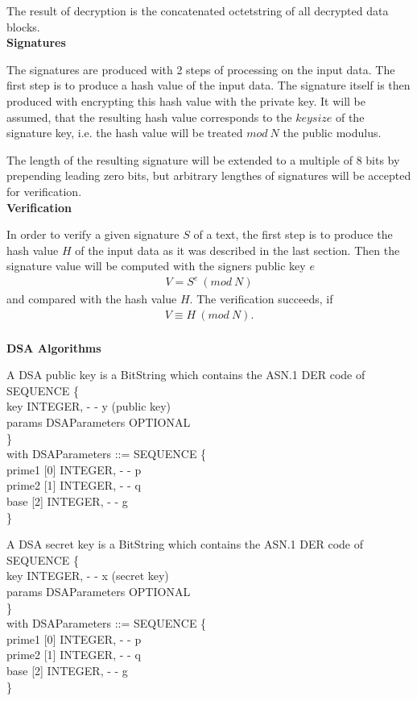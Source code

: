 The result of decryption is the concatenated octetstring of all decrypted
data blocks.
\\ [1em]
{\bf Signatures} 

The signatures are produced with 2 steps of processing on the input data.
The first step is to produce a hash value of the input data. The signature
itself is then produced with encrypting this hash value with the private
key. It will be assumed, that the resulting hash value corresponds to the
$keysize$ of the signature key, i.e. the hash value will be treated $mod 
~N$
the public modulus.

The length of the resulting signature will be extended to a multiple of
8 bits by prepending leading zero bits, but arbitrary lengthes of
signatures will be accepted for verification.
\\ [1em]
{\bf Verification}

In order to verify a given signature $S$ of a text, the first step is to
produce the hash value $H$ of the input data as it was described in the 
last section.
Then the signature value will be computed with the signers public key $e$ 
\begin{eqnarray*}
	V = S^e ~(mod ~N)
\end{eqnarray*}
\noindent
and compared with the hash value $H$. The verification succeeds, if
\begin{eqnarray*}
	V \equiv H ~(mod ~N).
\end{eqnarray*}
\\ [1em]
{\large\bf DSA Algorithms}

    A DSA public key is a BitString
    which contains the ASN.1 DER code of
    \bvtab
    \4  SEQUENCE \{ \\
    \4  \2       key INTEGER, - - y (public key)   \\
    \4  \2       params DSAParameters OPTIONAL  \\
    \4  \} \\
    \evtab
    with
    \bvtab
    DSAParameters ::= SEQUENCE \{ \\
    \4  \2       prime1 [0] INTEGER, - - p \\
    \4  \2       prime2 [1] INTEGER, - - q \\
    \4  \2       base [2] INTEGER, - - g \\
    \4  \} \\
    \evtab
    
    A DSA secret key is a BitString
    which contains the ASN.1 DER code of
    \bvtab
    \4  SEQUENCE \{ \\
    \4  \2       key INTEGER, - - x (secret key)   \\
    \4  \2       params DSAParameters OPTIONAL  \\
    \4  \} \\
    \evtab
    with
    \bvtab
    DSAParameters ::= SEQUENCE \{ \\
    \4  \2       prime1 [0] INTEGER, - - p \\
    \4  \2       prime2 [1] INTEGER, - - q \\
    \4  \2       base [2] INTEGER, - - g \\
    \4  \} \\
    \evtab


